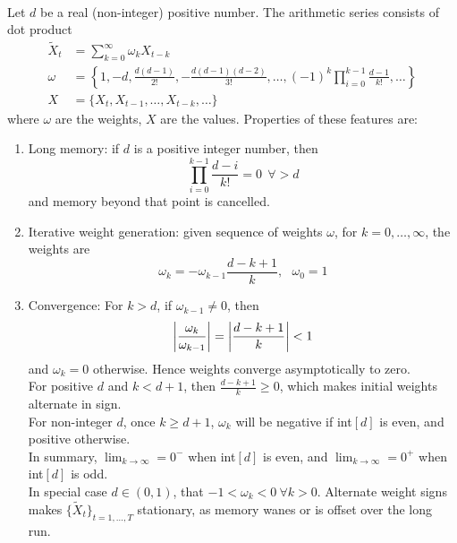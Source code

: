 \begin{remark}
\label{rmk:propfracdifffeat} 
\\
Let $d$ be a real (non-integer) positive number. The arithmetic series consists of dot product
\begin{align}
\tilde{X}_t &= \sum\limits_{k=0}^{\infty} \omega_k X_{t-k} \nonumber \\
\omega &= \left\{ 1, -d, \frac{d(d-1)}{2!}, - \frac{d(d-1)(d-2)}{3!}, \ldots, (-1)^k \prod\limits_{i=0}^{k-1} \frac{d-1}{k!}, \ldots \right\} \nonumber \\
X &= \{X_t, X_{t-1}, \ldots, X_{t-k}, \ldots \} \nonumber
\end{align}
where $\omega$ are the weights, $X$ are the values. Properties of these features are:
\begin{enumerate}[label=\roman*.]
\setlength{\itemsep}{0pt}
\item Long memory: if $d$ is a positive integer number, then
\begin{equation}
\prod\limits_{i=0}^{k-1} \frac{d-i}{k!} = 0 \ \ \forall > d \nonumber
\end{equation}
and memory beyond that point is cancelled.
\item Iterative weight generation: given sequence of weights $\omega$, for $k = 0, \ldots, \infty$, the weights are
\begin{equation}
\omega_k = - \omega_{k-1} \frac{d - k + 1}{k}, \ \ \ \omega_0 = 1 \nonumber
\end{equation}
\item Convergence: For $k > d$, if $\omega_{k-1} \neq 0$, then
\begin{equation}
\left\lvert\frac{\omega_{k}}{\omega_{k-1}}\right\rvert = \left\lvert\frac{d-k+1}{k}\right\rvert < 1 \nonumber
\end{equation}
and $\omega_k = 0$ otherwise. Hence weights converge asymptotically to zero.\\
For positive $d$ and $k < d+1$, then $\frac{d-k+1}{k} \geq 0$, which makes initial weights alternate in sign.\\
For non-integer $d$, once $k \geq d+1$, $\omega_k$ will be negative if int$[d]$ is even, and positive otherwise.\\
In summary, $\lim_{k \rightarrow \infty} = 0^-$ when int$[d]$ is even, and $\lim_{k \rightarrow \infty} = 0^+$ when int$[d]$ is odd.\\
In special case $d \in (0,1)$, that $-1 < \omega_k < 0 \ \forall k > 0$. Alternate weight signs makes $\{\tilde{X}_t \}_{t = 1, \ldots, T}$ stationary, as memory wanes or is offset over the long run.
\end{enumerate}
\end{remark}

